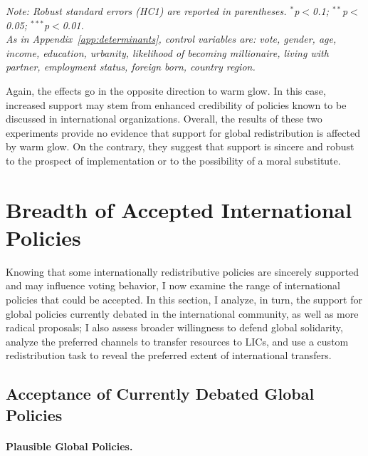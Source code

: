 \documentclass[12pt,english]{article}
\begin{document}
\begin{bibunit}
\begin{table}[!htbp]
  \caption[Effect on support for global redistribution of believing that it is likely]{Effect on support for global redistribution of believing that it is likely.}\label{tab:iv}
  \makebox[\textwidth][c]{}
  \textit{Note: Robust standard errors (HC1) are reported in parentheses. \hfill
  $^{*}$p$<$0.1; $^{**}$p$<$0.05; $^{***}$p$<$0.01. \\
  As in Appendix~\ref{app:determinants}, control variables are: vote, gender, age, income, education, urbanity, likelihood of becoming millionaire, living with partner, employment status, foreign born, country region.}
\end{table}

Again, the effects go in the opposite direction to warm glow. In this case, increased support may stem from enhanced credibility of policies known to be discussed in international organizations.
Overall, the results of these two experiments provide no evidence that support for global redistribution is affected by warm glow. On the contrary, they suggest that support is sincere and robust to the prospect of implementation or to the possibility of a moral substitute.


\section{Breadth of Accepted International Policies\label{sec:breadth}}

Knowing that some internationally redistributive policies are sincerely supported and may influence voting behavior, I now examine the range of international policies that could be accepted. In this section, I analyze, in turn, the support for global policies currently debated in the international community, as well as more radical proposals; I also assess broader willingness to defend global solidarity, analyze the preferred channels to transfer resources to LICs, and use a custom redistribution task to reveal the preferred extent of international transfers.

\subsection{Acceptance of Currently Debated Global Policies}\label{subsec:debated}

\paragraph{Plausible Global Policies.}


\end{bibunit}
\end{document}
